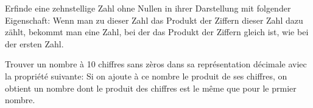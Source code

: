 Erfinde eine zehnstellige Zahl ohne Nullen in ihrer Darstellung mit folgender Eigenschaft: Wenn man zu dieser Zahl das Produkt der Ziffern dieser Zahl dazu zählt, bekommt man eine Zahl, bei der das Produkt der Ziffern gleich ist, wie bei der ersten Zahl.

\bigskip

Trouver un nombre à 10 chiffres sans zèros dans sa représentation décimale aviec la propriété suivante: Si on ajoute à ce nombre le produit de ses chiffres, on obtient un nombre dont le produit des chiffres est le même que pour le prmier nombre.